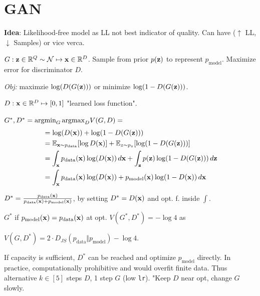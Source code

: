 \section{GAN}
\textbf{Idea}: Likelihood-free model as LL not best indicator of quality. Can have (\(\uparrow\) LL, \(\downarrow\) Samples) or vice verca.

\begin{definition}[Generator]
    \(G: \vb{z} \in \mathbb{R}^Q \sim \operatorname{\mathcal{N}} \mapsto \vb{x} \in \mathbb{R}^D\). Sample from prior \(p(\vb{z})\) to represent \(p_{\text{model}}\). Maximize error for discriminator \(D\).

    \textit{Obj:} maximzie \(\log(D(G(\vb{z})))\) or minimize \(\log(1 - D(G(\vb{z})))\).
\end{definition}

\begin{definition}[Discriminator]
    \(D: \vb{x} \in \mathbb{R}^D \mapsto [0, 1]\) "learned loss function".
\end{definition}

\begin{definition}
    \(G^*, D^* = \text{argmin}_{G} \, \text{argmax}_{D} V(G, D) = \)
    \begin{align*}
    &= \log(D(\vb{x})) + \log(1 - D(G(\vb{z}))) \\
    &= \mathbb{E}_{\vb{x} \sim p_{\text{data}}}[\log D(\vb{x})] + \mathbb{E}_{z \sim p_z}[\log(1 - D(G(\vb{z})))] \\
    &= \int_{\vb{x}} p_{\text{data}}(\vb{x})\log(D(\vb{x})) \, d\vb{x} + \int_{\vb{z}} p(\vb{z}) \log (1 - D(G(\vb{z}))) \, d\vb{z} \\
    &= \int_{\vb{x}} p_{\text{data}}(\vb{x}) \log(D(\vb{x})) + p_{\text{model}}(\vb{x}) \log(1 - D(\vb{x})) \, d\vb{x}
    \end{align*}
\end{definition}

\(D^* = \frac{p_{\text{data}}(\vb{x})}{p_{\text{data}}(\vb{x}) + p_{\text{model}}(\vb{x})}\), by setting \(D^* = D(\vb{x})\) and opt. f. inside \(\int\).

\(G^*\) if \(p_{\text{model}}(\vb{x}) = p_{\text{data}}(\vb{x})\) at opt. \(V(G^*, D^*) = -\log 4\) as

\(V(G, D^*) = 2 \cdot D_{JS}(p_{\text{data}} \Vert p_{\text{model}}) - \log 4\).

\begin{definition}[Convergence]
    If capacity is sufficient, \(D^*\) can be reached and optimize \(p_{\text{model}}\) directly. In practice, computationally prohibitive and would overfit finite data. Thus alternative \(k \in [5]\) steps \(D\), 1 step \(G\) (low \texttt{lr}). "Keep \(D\) near opt, change \(G\) slowly.
\end{definition}

